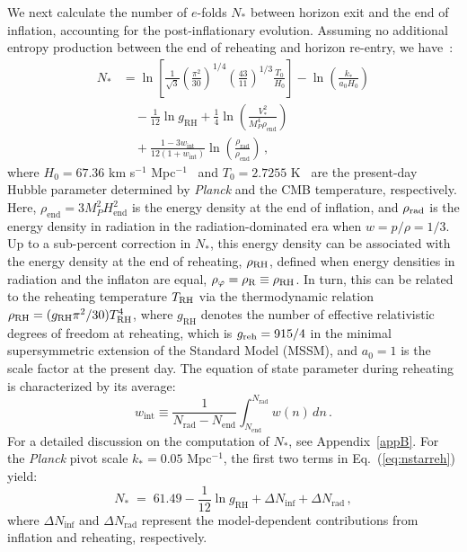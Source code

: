 \documentclass[aps,prev,twocolumn,preprintnumbers,floatfix,nofootinbib]{revtex4-1}
\begin{document}
We next calculate the number of $e$-folds $N_*$ between horizon exit and the end of inflation, accounting for the post-inflationary evolution. Assuming no additional entropy production between the end of reheating and horizon re-entry, we have~\cite{Martin:2010kz, LiddleLeach}:
\begin{equation}
\label{eq:nstarreh}
\begin{aligned}
N_{*} &= \ln\left[\frac{1}{\sqrt{3}}\left(\frac{\pi^{2}}{30}\right)^{1/4}\left(\frac{43}{11}\right)^{1/3} \frac{T_{0}}{H_{0}}\right] - \ln\left(\frac{k_{*}}{a_{0}H_{0}}\right) \\
&\quad - \frac{1}{12}\ln g_{\mathrm{RH}} + \frac{1}{4}\ln\left(\frac{V_{*}^{2}}{M_{P}^{4}\rho_{\mathrm{end}}}\right) \\
&\quad + \frac{1-3w_{\mathrm{int}}}{12(1+w_{\mathrm{int}})}\ln\left(\frac{\rho_{\mathrm{rad}}}{\rho_{\mathrm{end}}}\right) \,,
\end{aligned}
\end{equation}
where $H_0 = 67.36$ km s$^{-1}$ Mpc$^{-1}$~\cite{Planck} and $T_0 = 2.7255$ K~\cite{Fixsen:2009ug} are the present-day Hubble parameter determined by {\it Planck} and the CMB temperature, respectively. Here, $\rho_{\mathrm{end}} = 3M_P^2H_{\mathrm{end}}^2$ is the energy density at the end of inflation, and $\rho_{\rm rad}$ is the energy density in radiation in the radiation-dominated era  when $w = p/\rho = 1/3$. Up to a sub-percent correction in $N_*$, this energy density can be associated with the energy density at the end of reheating, $\rho_{\rm RH}$, defined when energy densities in radiation and the inflaton are equal,  $\rho_\varphi = \rho_{\rm R}\equiv \rho_{\rm RH}$. In turn, this can be related to the reheating temperature $T_{\rm RH}$ via the thermodynamic relation $ \rho_{\rm RH} =  (g_{\rm RH} \pi^2/30) T_{\rm RH}^4$, where $g_{\mathrm{RH}}$ denotes the number of effective relativistic degrees of freedom at reheating, which is $g_{\rm{reh}} =  915/4$ in the minimal supersymmetric extension of the Standard Model (MSSM), and $a_0 = 1$ is the scale factor at the present day. The equation of state parameter during reheating is characterized by its average:
\begin{equation}
w_{\mathrm{int}} \equiv \frac{1}{N_{\mathrm{rad}}-N_{\mathrm{end}}} \int_{N_{\mathrm{end}}}^{N_{\mathrm{rad}}} w(n) \, d n \, .
\end{equation}
For a detailed discussion on the computation of $N_*$, see Appendix~\ref{appB}.
For the \textit{Planck} pivot scale $k_* = 0.05$ Mpc$^{-1}$, the first two terms in Eq.~(\ref{eq:nstarreh}) yield:
\begin{equation}
N_* \; = \; 61.49 - \frac{1}{12}\ln g_{\mathrm{RH}} + \Delta N_{\mathrm{inf}} + \Delta N_{\mathrm{rad}} \,,
\end{equation}
where $\Delta N_{\mathrm{inf}}$ and $\Delta N_{\mathrm{rad}}$ represent the model-dependent contributions from inflation and reheating, respectively.
\end{document}
